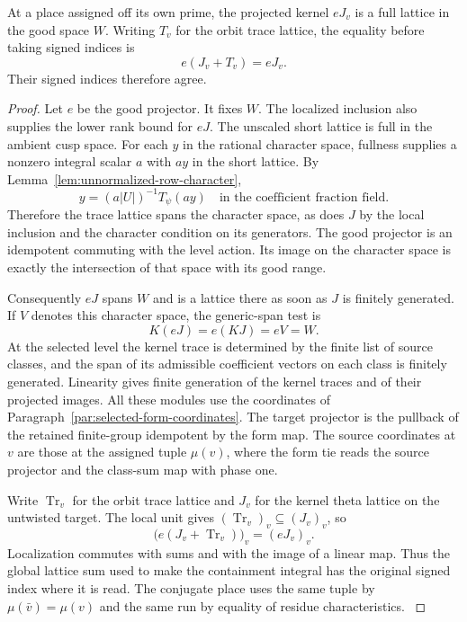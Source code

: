 

\begin{lemma}
\label{lem:projected-orbit-trace}
At a place assigned off its own prime, the projected kernel
\(eJ_v\) is a full lattice in the good space \(W\).
Writing \(T_v\) for the orbit trace lattice, the equality before taking signed indices is
\[
 e(J_v+T_v)=eJ_v.
\]
Their signed indices therefore agree.
\end{lemma}

\begin{proof}
Let \(e\) be the good projector. It fixes \(W\).
The localized inclusion also supplies the lower rank bound
for \(eJ\). The
unscaled short lattice is full in the ambient cusp space.
For each \(y\) in the rational character space, fullness supplies a
nonzero integral scalar \(a\) with \(ay\) in the short lattice. By
Lemma~\ref{lem:unnormalized-row-character},
\[
 y=(a|U|)^{-1}T_\psi(ay)
 \quad\text{in the coefficient fraction field}.
\] Therefore the trace lattice
spans the character space, as does \(J\) by the local
inclusion and the character condition on its generators.
The good projector is an idempotent commuting with the
level action. Its image on the character space is exactly
the intersection of that space with its good range.

Consequently \(eJ\) spans \(W\) and is a lattice there as
soon as \(J\) is finitely generated.
If \(V\) denotes this character space, the generic-span test is
\[
  K(eJ)=e(KJ)=eV=W .
\]
 At the selected level
the kernel trace is determined by the finite list of source
classes, and the span of its admissible coefficient vectors
on each class is finitely generated. Linearity gives finite
generation of the kernel traces and of their projected images.
All these modules use the coordinates of
Paragraph~\ref{par:selected-form-coordinates}.
The target projector is the pullback of the retained
finite-group idempotent by the form map. The source
coordinates at \(v\) are those at the assigned tuple \(\mu(v)\),
where the form tie reads the source projector and the class-sum
map with phase one.

Write \(\operatorname{Tr}_{v}\) for the
orbit trace lattice and \(J_v\) for the kernel theta lattice
on the untwisted target. The local unit gives
\((\operatorname{Tr}_{v})_v\subseteq (J_v)_v\), so
\[
       \big(e(J_v+\operatorname{Tr}_{v})\big)_v=(eJ_v)_v .
\]
Localization commutes with sums and with the image of a linear
map. Thus the global lattice sum used to make the containment
integral has the original signed index where it is read.
The conjugate place uses the same tuple by \(\mu(\bar v)=\mu(v)\)
and the same run by equality of residue characteristics.
\label{cor:paired-twist-index-2}
\end{proof}


